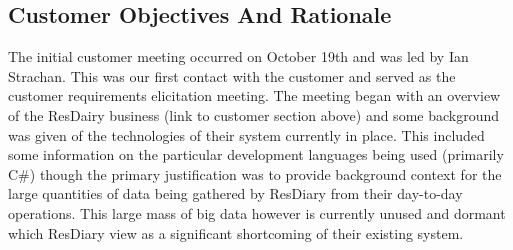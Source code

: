 \documentclass{l3proj}
\begin{document}
\subsection{Customer Objectives And Rationale}
\label{custobjectives}







The initial customer meeting occurred on October 19th and was led by Ian Strachan. This was our first contact with the customer and served as the customer requirements elicitation meeting. The meeting began with an overview of the ResDairy business (link to customer section above) and some background was given of the technologies of their system currently in place. This included some information on the particular development languages being used (primarily C\#) though the primary justification was to provide background context for the large quantities of data being gathered by ResDiary from their day-to-day operations. This large mass of big data however is currently unused and dormant which ResDiary view as a significant shortcoming of their existing system. 
\end{document}
